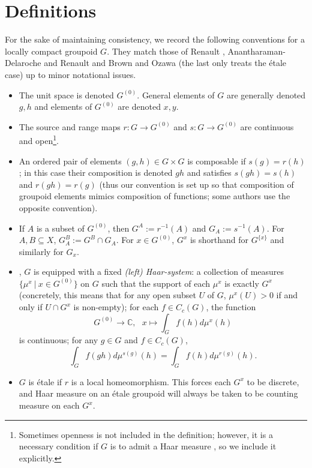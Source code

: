 \documentclass{article}
\newcommand{\C}{\mathbb{C}}
\theoremstyle{plain}
\theoremstyle{definition}
\theoremstyle{remark}
\begin{document}
\section{Definitions}

For the sake of maintaining consistency, we record the following conventions for a locally compact groupoid $G$.  They match those of Renault \cite[Chapter 1]{Renault:1980fk}, Anantharaman-Delaroche and Renault \cite[Introduction]{Anantharaman-Delaroche:2000mw} and Brown and Ozawa \cite[Section 5.6]{Brown:2008qy} (the last only treats the \'{e}tale case) up to minor notational issues.

\begin{itemize}
\item The unit space is denoted $G^{(0)}$.  General elements of $G$ are generally denoted $g,h$ and elements of $G^{(0)}$ are denoted $x,y$.  
\item The source and range maps $r:G\to G^{(0)}$ and $s:G\to G^{(0)}$ are continuous and open\footnote{Sometimes openness is not included in the definition; however, it is a necessary condition if $G$ is to admit a Haar measure \cite[Proposition I.2.4]{Renault:1980fk}, so we include it explicitly.}.
\item An ordered pair of elements $(g,h)\in G\times G$ is composable if $s(g)=r(h)$; in this case their composition is denoted $gh$ and satisfies $s(gh)=s(h)$ and $r(gh)=r(g)$ (thus our convention is set up so that composition of groupoid elements mimics composition of functions; some authors use the opposite convention).
\item If $A$ is a subset of $G^{(0)}$, then $G^A:=r^{-1}(A)$ and $G_A:=s^{-1}(A)$.  For $A,B\subseteq X$, $G_A^B:=G^B\cap G_A$.  For $x\in G^{(0)}$, $G^x$ is shorthand for $G^{\{x\}}$ and similarly for $G_x$.
\item  \cite[pages 14-15]{Anantharaman-Delaroche:2000mw}, \cite[Definition 2.2]{Renault:1980fk} $G$ is equipped with a fixed \emph{(left) Haar-system}: a collection of measures $\{\mu^x~|~x\in G^{(0)}\}$ on $G$ such that the support of each $\mu^x$ is exactly $G^x$ (concretely, this means that for any open subset $U$ of $G$, $\mu^x(U)>0$ if and only if $U\cap G^x$ is non-empty); for each $f\in C_c(G)$, the function
$$
G^{(0)}\to \C,~~~x\mapsto \int_G f(h)d\mu^x(h)
$$
is continuous; for any $g\in G$ and $f\in C_c(G)$, 
$$
\int_G f(gh)d\mu^{s(g)}(h)=\int_G f(h)d\mu^{r(g)}(h).
$$
\item $G$ is \'{e}tale if $r$ is a local homeomorphism.  This forces each $G^x$ to be discrete, and Haar measure on an \'{e}tale groupoid will always be taken to be counting measure on each $G^x$.

\end{itemize}
\end{document}
